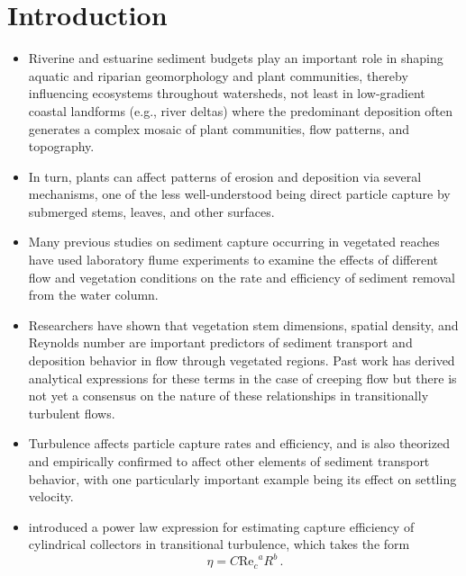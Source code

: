 \documentclass{article}
\newcommand\Rey{\mathrm{Re}}
\begin{document}
\section{Introduction}

\begin{itemize}

\item Riverine and estuarine sediment budgets play an important role in shaping aquatic and riparian geomorphology and plant communities, thereby influencing ecosystems throughout watersheds, not least in low-gradient coastal landforms (e.g., river deltas) where the predominant deposition often generates a complex mosaic of plant communities, flow patterns, and topography. 

\item In turn, plants can affect patterns of erosion and deposition via several mechanisms, one of the less well-understood being direct particle capture by submerged stems, leaves, and other surfaces. 

\item Many previous studies on sediment capture occurring in vegetated reaches have used laboratory flume experiments to examine the effects of different flow and vegetation conditions on the rate and efficiency of sediment removal from the water column.

\item Researchers have shown that vegetation stem dimensions, spatial density, and Reynolds number are important predictors of sediment transport and deposition behavior in flow through vegetated regions. Past work has derived analytical expressions for these terms in the case of creeping flow but there is not yet a consensus on the nature of these relationships in transitionally turbulent flows. 

\item Turbulence affects particle capture rates and efficiency, and is also theorized and empirically confirmed to affect other elements of sediment transport behavior, with one particularly important example being its effect on settling velocity.

\item \cite{Palmer_2004} introduced a power law expression for estimating capture efficiency of cylindrical collectors in transitional turbulence, which takes the form 
\begin{equation}
    \eta=C{\Rey_c}^{a}R^{b}\,.
    \label{eq:powerlaw}
\end{equation}


\end{itemize}
\end{document}
